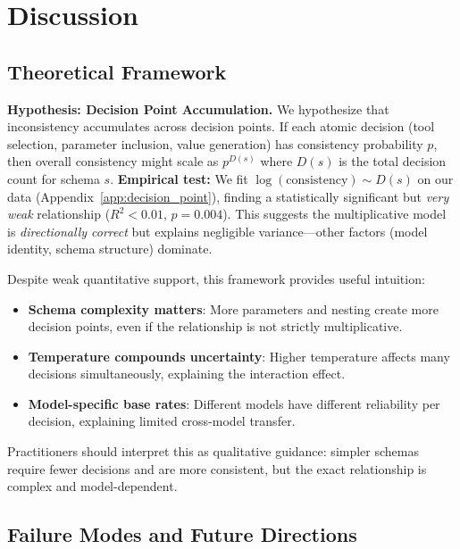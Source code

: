 \documentclass[sigconf,anonymous,review]{acmart}
\begin{document}
\section{Discussion}
\label{sec:discussion}

\subsection{Theoretical Framework}

\textbf{Hypothesis: Decision Point Accumulation.} We hypothesize that inconsistency accumulates across decision points. If each atomic decision (tool selection, parameter inclusion, value generation) has consistency probability $p$, then overall consistency might scale as $p^{D(s)}$ where $D(s)$ is the total decision count for schema $s$. \textbf{Empirical test:} We fit $\log(\text{consistency}) \sim D(s)$ on our data (Appendix~\ref{app:decision_point}), finding a statistically significant but \textit{very weak} relationship ($R^2 < 0.01$, $p = 0.004$). This suggests the multiplicative model is \textit{directionally correct} but explains negligible variance---other factors (model identity, schema structure) dominate.

Despite weak quantitative support, this framework provides useful intuition:

\begin{itemize}
    \item \textbf{Schema complexity matters}: More parameters and nesting create more decision points, even if the relationship is not strictly multiplicative.
    \item \textbf{Temperature compounds uncertainty}: Higher temperature affects many decisions simultaneously, explaining the interaction effect.
    \item \textbf{Model-specific base rates}: Different models have different reliability per decision, explaining limited cross-model transfer.
\end{itemize}

Practitioners should interpret this as qualitative guidance: simpler schemas require fewer decisions and are more consistent, but the exact relationship is complex and model-dependent.

\subsection{Failure Modes and Future Directions}
\end{document}
